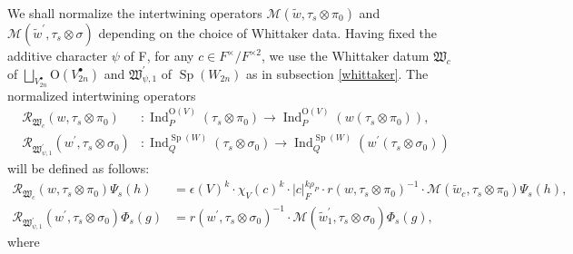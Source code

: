 \documentclass[article]{article}
\numberwithin{equation}{section}
\theoremstyle{definition}
\DeclareMathOperator{\Ind}{Ind}
\DeclareMathOperator{\SP}{Sp}
\begin{document}
We shall normalize the intertwining operators $\mathcal{M}\left(\widetilde{w}, \tau_{s} \otimes \pi_0\right)$ and $\mathcal{M}\left(\widetilde{w}^{\prime}, \tau_{s} \otimes \sigma \right)$ depending on the choice of Whittaker data. Having fixed the additive character $\psi$ of F, for any $c\in F^\times /F^{\times 2}$, we use the Whittaker datum $\mathfrak W_{c}$ of $\bigsqcup_{V_{2n}^{\bullet}}\mathrm O(V_{2n}^\bullet)$ and $\mathfrak W^\prime_{\psi,1}$ of $\SP(W_{2n})$ as in subsection \ref{whittaker}.  The normalized intertwining operators 
\begin{align*}
\mathcal R_{\mathfrak W_{c}}(w, \tau_s \otimes \pi_0) &: \Ind_{P}^{\mathrm{O}(V)}\left(\tau_s\otimes \pi_0\right)\rightarrow  \operatorname{Ind}_{P}^{\mathrm{O}(V)}\left(w(\tau_s \otimes \pi_0)\right),\\
\mathcal R_{\mathfrak W^\prime_{\psi,1}}\left(w^{\prime}, \tau_s \otimes \sigma_0\right) &: \operatorname{Ind}_{Q}^{\SP(W)}\left(\tau_s \otimes \sigma_0\right) \rightarrow \operatorname{Ind}_{Q}^{\SP(W)}\left(w^\prime(\tau_s \otimes \sigma_0)\right)
\end{align*}
will be defined as follows: 
\begin{align*}
\mathcal R_{\mathfrak W_{c}}(w, \tau_s \otimes \pi_0) \Psi_s(h) &=\epsilon(V)^{k} \cdot \chi_{V}(c)^{k}\cdot |c|_F^{k\rho_P}\cdot r(w,\tau_s\otimes
\pi_0)^{-1}\cdot \mathcal{M}(\widetilde{w}_{c}, \tau_s \otimes \pi_0) \Psi_s(h), \\ 
\mathcal R_{\mathfrak W^\prime_{\psi,1}}(w^\prime, \tau_s \otimes \sigma_0) \Phi_s(g) &=r(w^\prime,\tau_s\otimes
\sigma_0)^{-1}\cdot \mathcal{M}(\widetilde{w}_1^\prime, \tau_s \otimes \sigma_0) \Phi_s(g),
\end{align*}
where 
\end{document}
